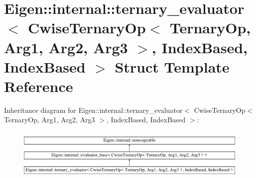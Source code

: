 \hypertarget{struct_eigen_1_1internal_1_1ternary__evaluator_3_01_cwise_ternary_op_3_01_ternary_op_00_01_arg1_daf42d21bcfee99cfa54e03ffa9506fc}{}\section{Eigen\+::internal\+::ternary\+\_\+evaluator$<$ Cwise\+Ternary\+Op$<$ Ternary\+Op, Arg1, Arg2, Arg3 $>$, Index\+Based, Index\+Based $>$ Struct Template Reference}
\label{struct_eigen_1_1internal_1_1ternary__evaluator_3_01_cwise_ternary_op_3_01_ternary_op_00_01_arg1_daf42d21bcfee99cfa54e03ffa9506fc}
Inheritance diagram for Eigen\+::internal\+::ternary\+\_\+evaluator$<$ Cwise\+Ternary\+Op$<$ Ternary\+Op, Arg1, Arg2, Arg3 $>$, Index\+Based, Index\+Based $>$\+:\begin{figure}[H]
\begin{center}
\leavevmode
\includegraphics[height=2.500000cm]{struct_eigen_1_1internal_1_1ternary__evaluator_3_01_cwise_ternary_op_3_01_ternary_op_00_01_arg1_daf42d21bcfee99cfa54e03ffa9506fc}
\end{center}
\end{figure}
